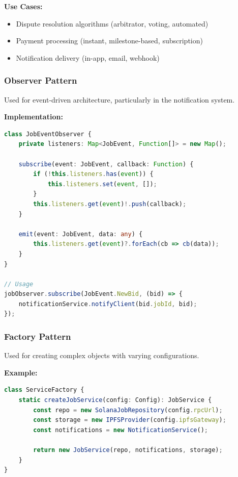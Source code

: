 \documentclass[a4paper,13pt,twoside]{report}
\theoremstyle{definition}
\begin{document}
\textbf{Use Cases:}
\begin{itemize}
    \item Dispute resolution algorithms (arbitrator, voting, automated)
    \item Payment processing (instant, milestone-based, subscription)
    \item Notification delivery (in-app, email, webhook)
\end{itemize}

\subsubsection{Observer Pattern}

Used for event-driven architecture, particularly in the notification system.

\textbf{Implementation:}
\begin{lstlisting}[language=TypeScript, caption=Event Observer Pattern]
class JobEventObserver {
    private listeners: Map<JobEvent, Function[]> = new Map();

    subscribe(event: JobEvent, callback: Function) {
        if (!this.listeners.has(event)) {
            this.listeners.set(event, []);
        }
        this.listeners.get(event)!.push(callback);
    }

    emit(event: JobEvent, data: any) {
        this.listeners.get(event)?.forEach(cb => cb(data));
    }
}

// Usage
jobObserver.subscribe(JobEvent.NewBid, (bid) => {
    notificationService.notifyClient(bid.jobId, bid);
});
\end{lstlisting}

\subsubsection{Factory Pattern}

Used for creating complex objects with varying configurations.

\textbf{Example:}
\begin{lstlisting}[language=TypeScript, caption=Service Factory]
class ServiceFactory {
    static createJobService(config: Config): JobService {
        const repo = new SolanaJobRepository(config.rpcUrl);
        const storage = new IPFSProvider(config.ipfsGateway);
        const notifications = new NotificationService();

        return new JobService(repo, notifications, storage);
    }
}
\end{lstlisting}
\end{document}

